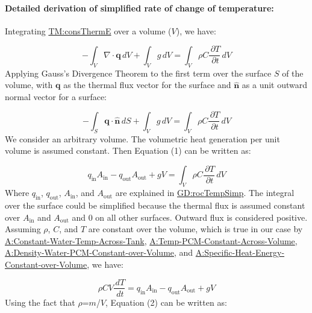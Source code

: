 \documentclass[12pt]{article}
\begin{document}
\paragraph{Detailed derivation of simplified rate of change of temperature:}
\label{GD:rocTempSimpDeriv}
Integrating \hyperref[TM:consThermE]{TM:consThermE} over a volume ($V$), we have:

\begin{displaymath}
-\int_{V}{∇\cdot{}\symbf{q}}\,dV+\int_{V}{g}\,dV=\int_{V}{ρ C \frac{\,\partial{}T}{\,\partial{}t}}\,dV
\end{displaymath}
Applying Gauss's Divergence Theorem to the first term over the surface $S$ of the volume, with $\symbf{q}$ as the thermal flux vector for the surface and $\symbf{\hat{n}}$ as a unit outward normal vector for a surface:

\begin{displaymath}
-\int_{S}{\symbf{q}\cdot{}\symbf{\hat{n}}}\,dS+\int_{V}{g}\,dV=\int_{V}{ρ C \frac{\,\partial{}T}{\,\partial{}t}}\,dV
\end{displaymath}
We consider an arbitrary volume. The volumetric heat generation per unit volume is assumed constant. Then Equation (1) can be written as:

\begin{displaymath}
{q_{\text{in}}} {A_{\text{in}}}-{q_{\text{out}}} {A_{\text{out}}}+g V=\int_{V}{ρ C \frac{\,\partial{}T}{\,\partial{}t}}\,dV
\end{displaymath}
Where ${q_{\text{in}}}$, ${q_{\text{out}}}$, ${A_{\text{in}}}$, and ${A_{\text{out}}}$ are explained in \hyperref[GD:rocTempSimp]{GD:rocTempSimp}. The integral over the surface could be simplified because the thermal flux is assumed constant over ${A_{\text{in}}}$ and ${A_{\text{out}}}$ and $0$ on all other surfaces. Outward flux is considered positive. Assuming $ρ$, $C$, and $T$ are constant over the volume, which is true in our case by \hyperref[assumpCWTAT]{A:Constant-Water-Temp-Across-Tank}, \hyperref[assumpTPCAV]{A:Temp-PCM-Constant-Across-Volume}, \hyperref[assumpDWPCoV]{A:Density-Water-PCM-Constant-over-Volume}, and \hyperref[assumpSHECov]{A:Specific-Heat-Energy-Constant-over-Volume}, we have:

\begin{displaymath}
ρ C V \frac{\,dT}{\,dt}={q_{\text{in}}} {A_{\text{in}}}-{q_{\text{out}}} {A_{\text{out}}}+g V
\end{displaymath}
Using the fact that $ρ$=$m$/$V$, Equation (2) can be written as:
\end{document}
